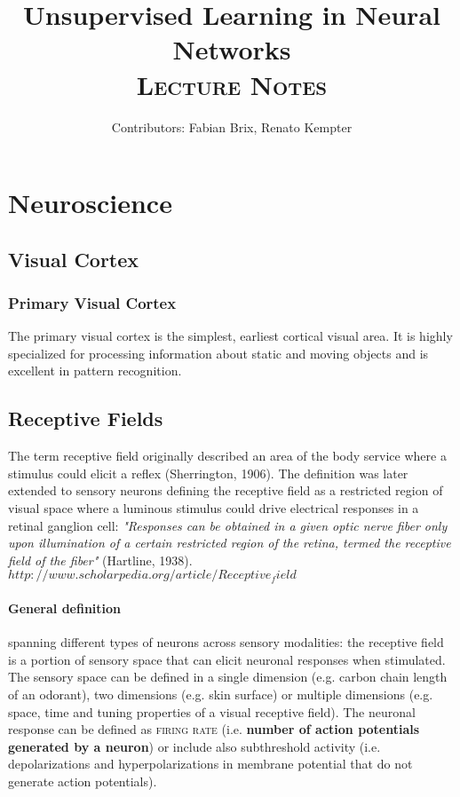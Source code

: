 \documentclass[11pt]{article}
\title{Unsupervised Learning in Neural Networks\\\Huge \textsc{Lecture Notes}}
\author{Contributors: Fabian Brix, Renato Kempter}
\begin{document}
\maketitle

\section{Neuroscience}

\subsection{Visual Cortex}

\subsubsection{Primary Visual Cortex}
The primary visual cortex is the simplest, earliest cortical visual area. It is highly specialized for processing information about static and moving objects and is excellent in pattern recognition.

\subsection{Receptive Fields}
The term receptive field originally described an area of the body service where a stimulus could elicit a reflex (Sherrington, 1906). The definition was later extended to sensory neurons defining the receptive field as a restricted region of visual space where a luminous stimulus could drive electrical responses in a retinal ganglion cell: \textit{"Responses can be obtained in a given optic nerve fiber only upon illumination of a certain restricted region of the retina, termed the receptive field of the fiber"} (Hartline, 1938).
$http://www.scholarpedia.org/article/Receptive_field$
\paragraph*{General definition} spanning different types of neurons across sensory modalities: the receptive field is a portion of sensory space that can elicit neuronal responses when stimulated. The sensory space can be defined in a single dimension (e.g. carbon chain length of an odorant), two dimensions (e.g. skin surface) or multiple dimensions (e.g. space, time and tuning properties of a visual receptive field). The neuronal response can be defined as \textsc{firing rate} (i.e. \textbf{number of action potentials generated by a neuron}) or include also subthreshold activity (i.e. depolarizations and hyperpolarizations in membrane potential that do not generate action potentials).
\end{document}
